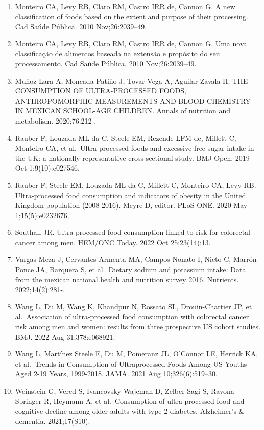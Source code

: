 \documentclass[
]{article}
\begin{document}
\begin{enumerate}
\item
  Monteiro CA, Levy RB, Claro RM, Castro IRR de, Cannon G. A new
  classification of foods based on the extent and purpose of their
  processing. Cad Saúde Pública. 2010 Nov;26:2039--49.
\item
  Monteiro CA, Levy RB, Claro RM, Castro IRR de, Cannon G. Uma nova
  classificação de alimentos baseada na extensão e propósito do seu
  processamento. Cad Saúde Pública. 2010 Nov;26:2039--49.
\item
  Muñoz-Lara A, Moncada-Patiño J, Tovar-Vega A, Aguilar-Zavala H. THE
  CONSUMPTION OF ULTRA-PROCESSED FOODS, ANTHROPOMORPHIC MEASUREMENTS AND
  BLOOD CHEMISTRY IN MEXICAN SCHOOL-AGE CHILDREN. Annals of nutrition
  and metabolism. 2020;76:212-.
\item
  Rauber F, Louzada ML da C, Steele EM, Rezende LFM de, Millett C,
  Monteiro CA, et al.~Ultra-processed foods and excessive free sugar
  intake in the UK: a nationally representative cross-sectional study.
  BMJ Open. 2019 Oct 1;9(10):e027546.
\item
  Rauber F, Steele EM, Louzada ML da C, Millett C, Monteiro CA, Levy RB.
  Ultra-processed food consumption and indicators of obesity in the
  United Kingdom population (2008-2016). Meyre D, editor. PLoS ONE. 2020
  May 1;15(5):e0232676.
\item
  Southall JR. Ultra-processed food consumption linked to risk for
  colorectal cancer among men. HEM/ONC Today. 2022 Oct 25;23(14):13.
\item
  Vargas-Meza J, Cervantes-Armenta MA, Campos-Nonato I, Nieto C,
  Marrón-Ponce JA, Barquera S, et al.~Dietary sodium and potassium
  intake: Data from the mexican national health and nutrition survey
  2016. Nutrients. 2022;14(2):281-.
\item
  Wang L, Du M, Wang K, Khandpur N, Rossato SL, Drouin-Chartier JP, et
  al.~Association of ultra-processed food consumption with colorectal
  cancer risk among men and women: results from three prospective US
  cohort studies. BMJ. 2022 Aug 31;378:e068921.
\item
  Wang L, Martínez Steele E, Du M, Pomeranz JL, O'Connor LE, Herrick KA,
  et al.~Trends in Consumption of Ultraprocessed Foods Among US Youths
  Aged 2-19 Years, 1999-2018. JAMA. 2021 Aug 10;326(6):519--30.
\item
  Weinstein G, Vered S, Ivancovsky‐Wajcman D, Zelber‐Sagi S,
  Ravona‐Springer R, Heymann A, et al.~Consumption of ultra‐processed
  food and cognitive decline among older adults with type‐2 diabetes.
  Alzheimer's \& dementia. 2021;17(S10).
\end{enumerate}
\end{document}

